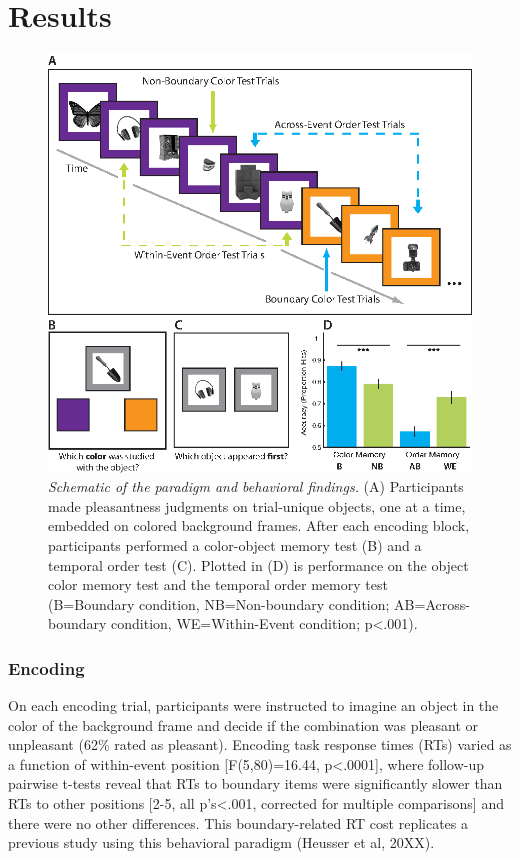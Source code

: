 \section{Results}\label{results}

\begin{figure}
  \centering
  \includegraphics[width=.75\textwidth]{figures/chapter2_figure1.eps}
  \caption[Schematic of the paradigm and behavioral findings]{\textit{Schematic of the paradigm and behavioral findings.} (A) Participants made pleasantness judgments on trial-unique objects, one at a time, embedded on colored background frames.  After each encoding block, participants performed a color-object memory test (B) and a temporal order test (C).  Plotted in (D) is performance on the object color memory test and the temporal order memory test (B=Boundary condition, NB=Non-boundary condition; AB=Across-boundary condition, WE=Within-Event condition; p<.001).}
  \label{chapter2_figure1}
\end{figure}

\subsubsection{Encoding}\label{encoding-1}

On each encoding trial, participants were instructed to imagine an
object in the color of the background frame and decide if the
combination was pleasant or unpleasant (62\% rated as pleasant).
Encoding task response times (RTs) varied as a function of within-event
position {[}F(5,80)=16.44, p\textless{}.0001{]}, where follow-up
pairwise t-tests reveal that RTs to boundary items were significantly
slower than RTs to other positions {[}2-5, all p's\textless{}.001,
corrected for multiple comparisons{]} and there were no other
differences. This boundary-related RT cost replicates a previous study
using this behavioral paradigm (Heusser et al, 20XX).

